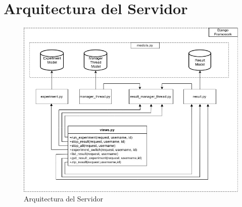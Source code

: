 \section{Arquitectura del Servidor}
\begin{figure}[!htb]
    \includegraphics[width=\linewidth]{../figures/d20.jpg}
    \caption{Arquitectura del Servidor}
    \label{fig:d20}
\end{figure}
\newpage
